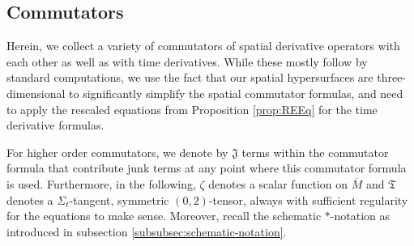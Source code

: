 \documentclass[11pt,leqno,textwidth=10cm]{amsart}
\numberwithin{equation}{section}
\theoremstyle{definition}
\theoremstyle{plain}
\newcommand{\1}{\mathbbm{1}}
\newcommand{\M}{\overline{M}}
\begin{document}
\subsection{Commutators}\label{subsec:commutators} Herein, we collect a variety of commutators of spatial derivative operators with each other as well as with time derivatives. While these mostly follow by standard computations, we use the fact that our spatial hypersurfaces are three-dimensional to significantly simplify the spatial commutator formulas, and need to apply the rescaled equations from Proposition \ref{prop:REEq} for the time derivative formulas.

For higher order commutators, we denote by $\mathfrak{J}$ terms within the commutator formula that contribute junk terms at any point where this commutator formula is used. Furthermore, in the following, $\zeta$ denotes a scalar function on $\M$ and $\mathfrak{T}$ denotes a $\Sigma_t$-tangent, symmetric $(0,2)$-tensor, always with sufficient regularity for the equations to make sense. Moreover, recall the schematic $\ast$-notation as introduced in subsection \ref{subsubsec:schematic-notation}.
\end{document}
